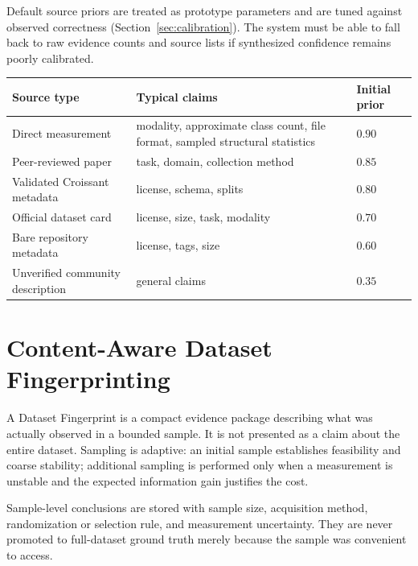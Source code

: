 \documentclass[11pt]{article}
\begin{document}
Default source priors are treated as prototype parameters and are tuned against observed correctness
(Section~\ref{sec:calibration}). The system must be able to fall back to raw evidence counts and source
lists if synthesized confidence remains poorly calibrated.

\begin{longtable}{@{}L{4.4cm}L{5.9cm}L{1.9cm}@{}}
\toprule
\textbf{Source type} & \textbf{Typical claims} & \textbf{Initial prior} \\
\midrule
\endhead
Direct measurement & modality, approximate class count, file format, sampled structural statistics &
  $0.90$ \\
Peer-reviewed paper & task, domain, collection method & $0.85$ \\
Validated Croissant metadata & license, schema, splits & $0.80$ \\
Official dataset card & license, size, task, modality & $0.70$ \\
Bare repository metadata & license, tags, size & $0.60$ \\
Unverified community description & general claims & $0.35$ \\
\bottomrule
\end{longtable}

\section{Content-Aware Dataset Fingerprinting}
A Dataset Fingerprint is a compact evidence package describing what was actually observed in a bounded
sample. It is not presented as a claim about the entire dataset. Sampling is adaptive: an initial sample
establishes feasibility and coarse stability; additional sampling is performed only when a measurement is
unstable and the expected information gain justifies the cost.

Sample-level conclusions are stored with sample size, acquisition method, randomization or selection rule,
and measurement uncertainty. They are never promoted to full-dataset ground truth merely because the
sample was convenient to access.
\end{document}
